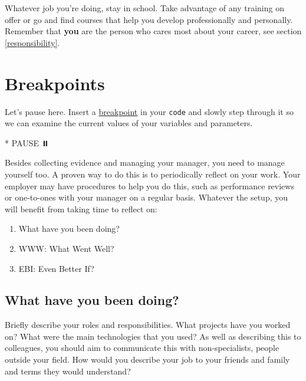 \documentclass[
]{book}
\newenvironment{Shaded}{\begin{snugshade}}{\end{snugshade}}
\newcommand{\NormalTok}[1]{#1}
\newcommand{\SpecialStringTok}[1]{\textcolor[rgb]{0.31,0.60,0.02}{#1}}
\providecommand{\tightlist}{%
  \setlength{\itemsep}{0pt}\setlength{\parskip}{0pt}}
\begin{document}
Whatever job you're doing, stay in school. Take advantage of any training on offer or go and find courses that help you develop professionally and personally. Remember that \textbf{you} are the person who cares most about your career, see section \ref{responsibility}.

\hypertarget{visits}{%
\section{Breakpoints}\label{visits}}

Let's pause here. Insert a \href{https://en.wikipedia.org/wiki/Breakpoint}{breakpoint} in your \texttt{code} and slowly step through it so we can examine the current values of your variables and parameters.

\begin{Shaded}
\begin{Highlighting}[]
\SpecialStringTok{* }\NormalTok{PAUSE ⏸️}
\end{Highlighting}
\end{Shaded}

Besides collecting evidence and managing your manager, you need to manage yourself too. A proven way to do this is to periodically reflect on your work. Your employer may have procedures to help you do this, such as performance reviews or one-to-ones with your manager on a regular basis. Whatever the setup, you will benefit from taking time to reflect on:

\begin{enumerate}
\def\labelenumi{\arabic{enumi}.}
\tightlist
\item
  What have you been doing?
\item
  WWW: What Went Well?
\item
  EBI: Even Better If?
\end{enumerate}

\hypertarget{what-have-you-been-doing}{%
\subsection{What have you been doing?}\label{what-have-you-been-doing}}

Briefly describe your roles and responsibilities. What projects have you worked on? What were the main technologies that you used? As well as describing this to colleagues, you should aim to communicate this with non-specialists, people outside your field. How would you describe your job to your friends and family and terms they would understand?
\end{document}

